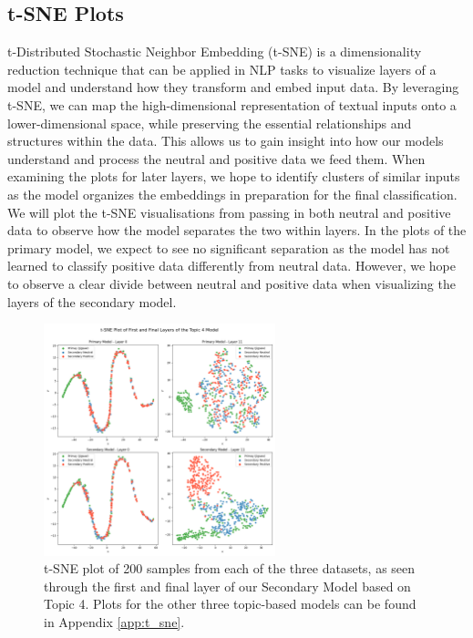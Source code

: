 \subsection{t-SNE Plots}

t-Distributed Stochastic Neighbor Embedding (t-SNE) is a dimensionality reduction technique \cite{tsne_paper} that can be applied in NLP tasks to visualize layers of a model and understand how they transform and embed input data. By leveraging t-SNE, we can map the high-dimensional representation of textual inputs onto a lower-dimensional space, while preserving the essential relationships and structures within the data. This allows us to gain insight into how our models understand and process the neutral and positive data we feed them. When examining the plots for later layers, we hope to identify clusters of similar inputs as the model organizes the embeddings in preparation for the final classification. We will plot the t-SNE visualisations from passing in both neutral and positive data to observe how the model separates the two within layers. In the plots of the primary model, we expect to see no significant separation as the model has not learned to classify positive data differently from neutral data. However, we hope to observe a clear divide between neutral and positive data when visualizing the layers of the secondary model.

\begin{figure}[ht]
    \centering
    \includegraphics[width=0.6\textwidth]{graphs/tsne/topic_4.png}
    \caption{t-SNE plot of 200 samples from each of the three datasets, as seen through the first and final layer of our Secondary Model based on Topic 4. Plots for the other three topic-based models can be found in Appendix \ref{app:t_sne}.}
    \label{fig:t_sne_plot}
\end{figure}

